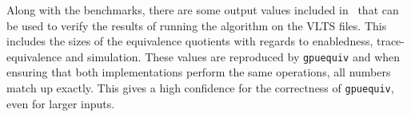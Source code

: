 Along with the benchmarks, there are some output values included
in~\cite{bisping2023process}
that can be used to verify the results of running the algorithm on the VLTS
files.
This includes the sizes of the equivalence quotients with regards to
enabledness, trace-equivalence and simulation.
These values are reproduced by \texttt{gpuequiv}
and when ensuring that both implementations perform the same operations,
all numbers match up exactly.
This gives a high confidence for the correctness of \texttt{gpuequiv},
even for larger inputs.
